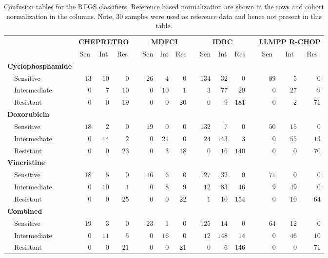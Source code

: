 \begin{table}[!tbp]
{\small
\caption{Confusion tables for the REGS classifiers.
Reference based normalization are shown in the rows and cohort normalization in
the columns. Note, 30 samples were used as reference data and hence not present
in this table.\label{tab:confusiondrugreference}} 
\begin{center}
\begin{tabular}{lrrrcrrrcrrrcrrr}
\hline\hline
\multicolumn{1}{l}{\bfseries }&\multicolumn{3}{c}{\bfseries CHEPRETRO}&\multicolumn{1}{c}{\bfseries }&\multicolumn{3}{c}{\bfseries MDFCI}&\multicolumn{1}{c}{\bfseries }&\multicolumn{3}{c}{\bfseries IDRC}&\multicolumn{1}{c}{\bfseries }&\multicolumn{3}{c}{\bfseries LLMPP R-CHOP}\tabularnewline
\cline{2-4} \cline{6-8} \cline{10-12} \cline{14-16}
\multicolumn{1}{l}{}&\multicolumn{1}{c}{Sen}&\multicolumn{1}{c}{Int}&\multicolumn{1}{c}{Res}&\multicolumn{1}{c}{}&\multicolumn{1}{c}{Sen}&\multicolumn{1}{c}{Int}&\multicolumn{1}{c}{Res}&\multicolumn{1}{c}{}&\multicolumn{1}{c}{Sen}&\multicolumn{1}{c}{Int}&\multicolumn{1}{c}{Res}&\multicolumn{1}{c}{}&\multicolumn{1}{c}{Sen}&\multicolumn{1}{c}{Int}&\multicolumn{1}{c}{Res}\tabularnewline
\hline
{\bfseries Cyclophosphamide}&&&&&&&&&&&&&&&\tabularnewline
~~Sensitive&$13$&$10$&$ 0$&&$26$&$ 4$&$ 0$&&$134$&$ 32$&$  0$&&$89$&$ 5$&$ 0$\tabularnewline
~~Intermediate&$ 0$&$ 7$&$10$&&$ 0$&$10$&$ 1$&&$  3$&$ 77$&$ 29$&&$ 0$&$27$&$ 9$\tabularnewline
~~Resistant&$ 0$&$ 0$&$19$&&$ 0$&$ 0$&$20$&&$  0$&$  9$&$181$&&$ 0$&$ 2$&$71$\tabularnewline
\hline
{\bfseries Doxorubicin}&&&&&&&&&&&&&&&\tabularnewline
~~Sensitive&$18$&$ 2$&$ 0$&&$19$&$ 0$&$ 0$&&$132$&$  7$&$  0$&&$50$&$15$&$ 0$\tabularnewline
~~Intermediate&$ 0$&$14$&$ 2$&&$ 0$&$21$&$ 0$&&$ 24$&$143$&$  3$&&$ 0$&$55$&$13$\tabularnewline
~~Resistant&$ 0$&$ 0$&$23$&&$ 0$&$ 3$&$18$&&$  0$&$ 16$&$140$&&$ 0$&$ 0$&$70$\tabularnewline
\hline
{\bfseries Vincristine}&&&&&&&&&&&&&&&\tabularnewline
~~Sensitive&$18$&$ 5$&$ 0$&&$16$&$ 6$&$ 0$&&$127$&$ 32$&$  0$&&$71$&$ 0$&$ 0$\tabularnewline
~~Intermediate&$ 0$&$10$&$ 1$&&$ 0$&$ 8$&$ 9$&&$ 12$&$ 83$&$ 46$&&$ 9$&$49$&$ 0$\tabularnewline
~~Resistant&$ 0$&$ 0$&$25$&&$ 0$&$ 0$&$22$&&$  1$&$ 10$&$154$&&$ 0$&$10$&$64$\tabularnewline
\hline
{\bfseries Combined}&&&&&&&&&&&&&&&\tabularnewline
~~Sensitive&$19$&$ 3$&$ 0$&&$23$&$ 1$&$ 0$&&$125$&$ 14$&$  0$&&$64$&$12$&$ 0$\tabularnewline
~~Intermediate&$ 0$&$11$&$ 5$&&$ 0$&$16$&$ 0$&&$ 12$&$148$&$ 14$&&$ 0$&$46$&$10$\tabularnewline
~~Resistant&$ 0$&$ 0$&$21$&&$ 0$&$ 0$&$21$&&$  0$&$  6$&$146$&&$ 0$&$ 0$&$71$\tabularnewline
\hline
\end{tabular}\end{center}}

\end{table}

